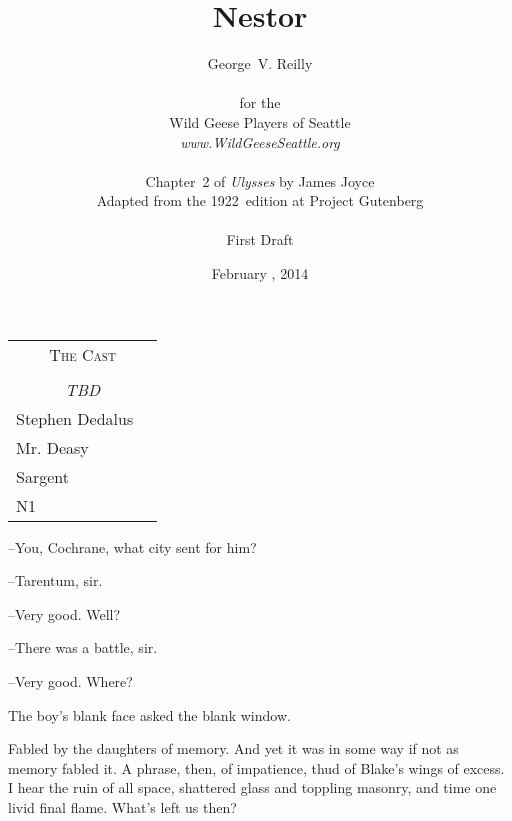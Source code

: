 



\title{\Huge Nestor}
\author{George~V. Reilly\\
\\
{\small for the}\\
Wild Geese Players of Seattle\\
{\emph{www.WildGeeseSeattle.org}}\\
\\
{\small Chapter~2 of \emph{Ulysses} by James Joyce}\\
{\small Adapted from the 1922~edition at Project Gutenberg}
\\
\\
{\small First Draft}}
\date{February , 2014}
\raggedbottom



\maketitle
\thispagestyle{empty}
\pagebreak

\begin{tabular}{lp{10cm}}
    \multicolumn{2}{c}{\Large \textsc{The Cast}} \\
\\
    \multicolumn{2}{c}{\large \textit{TBD}} \\
Stephen Dedalus \\
Mr. Deasy \\
Sargent \\
N1 \\
\end{tabular}

\thispagestyle{empty}
\newpage


\setcounter{page}{1}


--You, Cochrane, what city sent for him?

--Tarentum, sir.

--Very good. Well?

--There was a battle, sir.

--Very good. Where?

The boy's blank face asked the blank window.

Fabled by the daughters of memory. And yet it was in some way if not as
memory fabled it. A phrase, then, of impatience, thud of Blake's wings of
excess. I hear the ruin of all space, shattered glass and toppling
masonry, and time one livid final flame. What's left us then?

